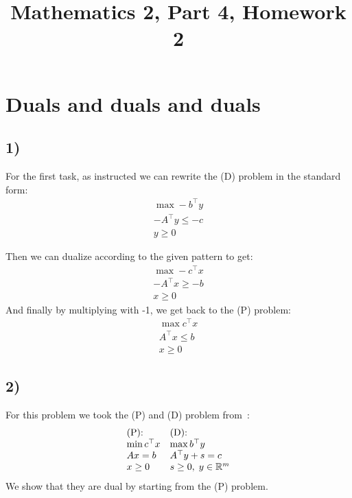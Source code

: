 \documentclass[9pt]{IEEEtran}
\title{\vspace{0ex}
Mathematics 2, Part 4, Homework 2}
\begin{document}
\maketitle
\section{Duals and duals and duals}
\subsection*{1)}
For the first task, as instructed we can rewrite the (D) problem in the 
standard form: 
\[
\begin{aligned}
\max -b^\top y \\ 
-A^\top y \le -c \\
 y \ge 0
\end{aligned}
\]

Then we can dualize according to the given pattern to get:
\[
\begin{aligned}
\max -c^\top x \\ 
-A^\top x \ge -b \\
 x \ge 0
\end{aligned}
\]
And finally by multiplying with -1, we get back to the (P) problem:
\[
\begin{aligned}
\max c^\top x \\ 
A^\top x \le b \\
 x \ge 0
\end{aligned}
\]

\subsection*{2)}
For this problem we took the (P) and (D) problem from~\cite{mehlhorn2016still}:
\[
\begin{array}{l l}
\centering
\text{(P):} & \text{(D):} \\
\min c^\top x & \max b^\top y \\
Ax = b & A^\top y + s = c \\
x \ge 0 & s \ge 0, \; y \in \mathbb{R}^m
\end{array}
\]
We show that they are dual by starting from the (P) problem. 


  

\end{document}
